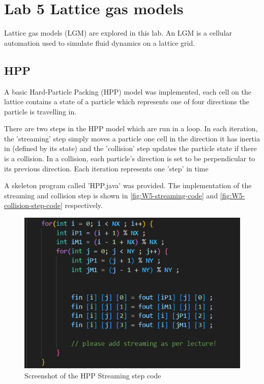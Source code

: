 \newpage
\section{Lab 5 Lattice gas models}
Lattice gas models (LGM) are explored in this lab. An LGM is a cellular automation used to simulate fluid dynamics on a lattice grid.



\subsection{HPP}
A basic Hard-Particle Packing (HPP) model was implemented, each cell on the lattice contains a state of a particle which represents one of four directions the particle is travelling in.

There are two steps in the HPP model which are run in a loop. In each iteration, the 'streaming' step simply moves a particle one cell in the direction it has inertia in (defined by its state) and the 'collision' step updates the particle state if there is a collision. In a collision, each particle's direction is set to be perpendicular to its previous direction. Each iteration represents one 'step' in time

A skeleton program called 'HPP.java' was provided. The implementation of the streaming and collision step is shown in \autoref{fig:W5-streaming-code} and \autoref{fig:W5-collision-step-code} respectively.


\begin{figure}[H] 
    \centering
    \includegraphics[width=0.59\columnwidth]{Figures/Week 5/HPP Streaming Step code.png}
    \caption{Screenshot of the HPP Streaming step code}
    \label{fig:W5-streaming-code}
\end{figure}

